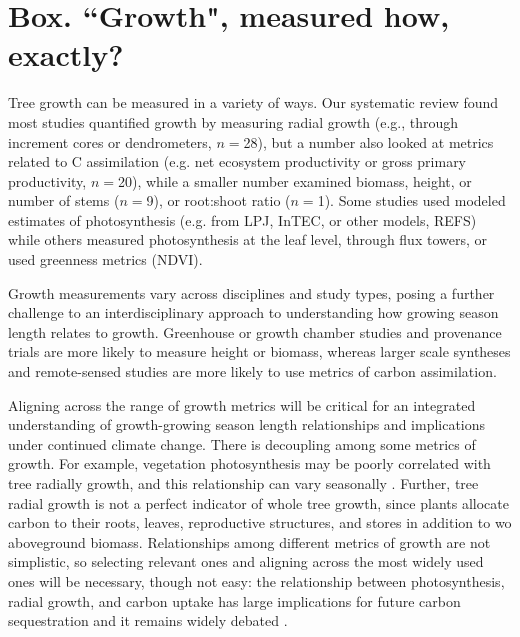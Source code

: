 \documentclass[11pt]{article}
\begin{document}
\newpage
\section{Box. ``Growth", measured how, exactly?}
Tree growth can be measured in a variety of ways. Our systematic review found most studies quantified growth by measuring radial growth (e.g., through increment cores or dendrometers, $n=$28), but a number also looked at metrics related to C assimilation (e.g. net ecosystem productivity or gross primary productivity, $n=$20), while a smaller number examined biomass, height, or number of stems ($n=$9), or root:shoot ratio ($n=$1). Some studies used modeled estimates of photosynthesis (e.g. from LPJ, InTEC, or other models, REFS) while others measured photosynthesis at the leaf level, through flux towers, or used greenness metrics (NDVI). 

Growth measurements vary across disciplines and study types, posing a further challenge to an interdisciplinary approach to understanding how growing season length relates to growth. Greenhouse or growth chamber studies and provenance trials are more likely to measure height or biomass, whereas larger scale syntheses and remote-sensed studies are more likely to use metrics of carbon assimilation. 

Aligning across the range of growth metrics will be critical for an integrated understanding of growth-growing season length relationships and implications under continued climate change.  There is decoupling among some metrics of growth. For example, vegetation photosynthesis may be poorly correlated with tree radially growth, and this relationship can vary seasonally \citep{cabon2022cross}. Further, tree radial growth is not a perfect indicator of whole tree growth, since plants allocate
carbon to their roots, leaves, reproductive structures, and stores in addition to wo aboveground biomass. Relationships among different metrics of growth are not simplistic, so selecting relevant ones and aligning across the most widely used ones will be necessary, though not easy: the relationship  between photosynthesis, radial growth, and carbon uptake has large implications for future carbon sequestration and it remains widely debated \citep{green2022limits}.


\newpage
\end{document}
